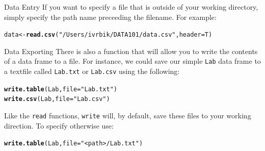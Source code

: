 \documentclass[xcolor=svgnames, 10pt]{beamer}
\makeatletter
\newcommand{\hlstr}[1]{\textcolor[rgb]{0.192,0.494,0.8}{#1}}%
\newcommand{\hlstd}[1]{\textcolor[rgb]{0.345,0.345,0.345}{#1}}%
\newcommand{\hlkwb}[1]{\textcolor[rgb]{0.69,0.353,0.396}{#1}}%
\newcommand{\hlkwc}[1]{\textcolor[rgb]{0.333,0.667,0.333}{#1}}%
\newcommand{\hlkwd}[1]{\textcolor[rgb]{0.737,0.353,0.396}{\textbf{#1}}}%
\newenvironment{kframe}{%
 \def\at@end@of@kframe{}%
 \ifinner\ifhmode%
  \def\at@end@of@kframe{\end{minipage}}%
  \begin{minipage}{\columnwidth}%
 \fi\fi%
 \def\FrameCommand##1{\hskip\@totalleftmargin \hskip-\fboxsep
 \colorbox{shadecolor}{##1}\hskip-\fboxsep
     \hskip-\linewidth \hskip-\@totalleftmargin \hskip\columnwidth}%
 \MakeFramed {\advance\hsize-\width
   \@totalleftmargin\z@ \linewidth\hsize
   \@setminipage}}%
 {\par\unskip\endMakeFramed%
 \at@end@of@kframe}
\newenvironment{knitrout}{}{} %
\makeatother
\begin{document}
\begin{frame}[fragile]{Data Entry}
If you want to specify a file that is outside of your working directory, simply specify the path name preceeding the filename. For example:
\begin{knitrout}\footnotesize
{}\color{fgcolor}\begin{kframe}
\begin{alltt}
\hlstd{data} \hlkwb{<-} \hlkwd{read.csv}\hlstd{(}\hlstr{"/Users/ivrbik/DATA101/data.csv"}\hlstd{,} \hlkwc{header}\hlstd{=T)}
\end{alltt}
\end{kframe}
\end{knitrout}
\end{frame}
%


\begin{frame}[fragile]{Data Exporting}
There is also a function that will allow you to write the contents of a data frame to a file.  For instance, we could save our simple {\tt Lab} data frame to a textfile called {\tt Lab.txt} or  {\tt Lab.csv} using the following:
\begin{knitrout}\footnotesize
{}\color{fgcolor}\begin{kframe}
\begin{alltt}
\hlkwd{write.table}\hlstd{(Lab,} \hlkwc{file}\hlstd{=}\hlstr{"Lab.txt"}\hlstd{)}
\hlkwd{write.csv}\hlstd{(Lab,} \hlkwc{file}\hlstd{=}\hlstr{"Lab.csv"}\hlstd{)}
\end{alltt}
\end{kframe}
\end{knitrout}
Like the {\tt read} functions, {\tt write} will, by default, save these files to your working direction. To specify otherwise use:
\begin{knitrout}\footnotesize
{}\color{fgcolor}\begin{kframe}
\begin{alltt}
\hlkwd{write.table}\hlstd{(Lab,} \hlkwc{file}\hlstd{=}\hlstr{"<path>/Lab.txt"}\hlstd{)}
\end{alltt}
\end{kframe}
\end{knitrout}
\end{frame}
\end{document}
